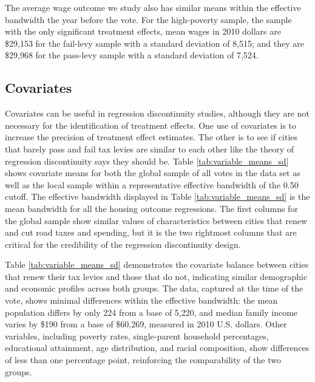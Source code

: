 The average wage outcome we study also has similar means within the effective bandwidth the year before the vote.  For the high-poverty sample, the sample with the only significant treatment effects, mean wages in 2010 dollars are \$29,153 for the fail-levy sample with a standard deviation of 8,515; and they are \$29,968 for the pass-levy sample with a standard deviation of 7,524.

\subsection{Covariates}

Covariates can be useful in regression discontinuity studies, although they are not necessary for the identification of treatment effects.  One use of covariates is to increase the precision of treatment effect estimates.  The other is to see if cities that barely pass and fail tax levies are similar to each other like the theory of regression discontinuity says they should be. Table \ref{tab:variable_means_sd} shows covariate means for both the global sample of all votes in the data set as well as the local sample within a representative effective bandwidth of the 0.50 cutoff. The effective bandwidth displayed in Table \ref{tab:variable_means_sd} is the mean bandwidth for all the housing outcome regressions. The first columns for the global sample show similar values of characteristics between cities that renew and cut road taxes and spending, but it is the two rightmost columns that are critical for the credibility of the regression discontinuity design.   

Table \ref{tab:variable_means_sd} demonstrates the covariate balance between cities that renew their tax levies and those that do not, indicating similar demographic and economic profiles across both groups. The data, captured at the time of the vote, shows minimal differences within the effective bandwidth: the mean population differs by only 224 from a base of 5,220, and median family income varies by \$190 from a base of \$60,269, measured in 2010 U.S. dollars. Other variables, including poverty rates, single-parent household percentages, educational attainment, age distribution, and racial composition, show differences of less than one percentage point, reinforcing the comparability of the two groups.



